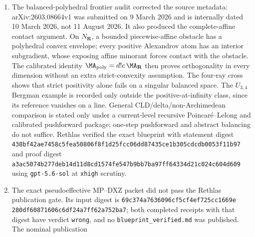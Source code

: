 \begin{enumerate}
  repaired proof first propagates a uniform lower bound from a rational
  interior point to its entire simplex using explicit barycentric
  coordinates; it then proves that every point is non-pluripolar and that
  the entire dual complex has \(d_\infty\)-diameter at most the same uniform
  constant before invoking Proposition~7.1.4.  The MP24 discrepancy issue is
  handled differently: reduced discrepancy is now imported from MPWN25
  Definition~2.4.1, the constant-ray obstruction to the printed MP24
  normalization is retained, and the expected reduced entropy-slope repair
  is not asserted as a theorem.  Consequently there is no unverified
  \texttt{RETHLAS-NEW} marker for that repair.  The finite-energy and
  model-to-cscK implications are imported directly from MPWN25
  Theorem~2.4.3 and Corollary~9.2.2.
\item The balanced-polyhedral frontier audit corrected the source metadata:
  arXiv:2603.08664v1 was submitted on 9 March 2026 and is internally dated
  10 March 2026, not 11 August 2026.  It also produced the complete-affine
  contact argument.  On \(N_{\mathbf R}\), a bounded piecewise-affine
  obstacle has a polyhedral convex envelope; every positive Alexandrov atom
  has an interior subgradient, whose exposing affine minorant forces contact
  with the obstacle.  The calibrated identity
  \(\MA_{\mathrm{poly}}=d!c\,\MA_{\mathbf R}\) then proves
  orthogonality in every dimension without an extra strict-convexity
  assumption.  The four-ray cross shows that strict positivity alone fails
  on a singular balanced space.  The \(U_{3,4}\) Bergman example is recorded
  only outside the positive-at-infinity class, since its reference vanishes
  on a line.  General CLD/delta/non-Archimedean comparison is stated only
  under a current-level recursive Poincar\'e--Lelong and calibrated
  pushforward package; one-step pushforward and abstract balancing do not
  suffice.  Rethlas verified the exact blueprint with statement digest
  \texttt{438bf42ae7458c5fea50806f8f1d25fcc06dd87435ce1b305cdcdb0053f11b97}
  and proof digest
  \texttt{a3ac5074b277deb14d11d8cd1574fe547b9bb7ba97ff64334d21c024c604d609}
  using \texttt{gpt-5.6-sol} at \texttt{xhigh} scrutiny.
\item The exact pseudoeffective MP--DXZ packet did not pass the Rethlas
  publication gate.  Its input digest is
  \texttt{69c374a7636096cf5cf4ef725cc1669e}
  \allowbreak\texttt{280df60871606c6df24a7ff62a752ba7}; both completed
  receipts with that digest have verdict \texttt{wrong}, and no
  \texttt{blueprint\_verified.md} was published.  The nominal publication

\end{enumerate}
